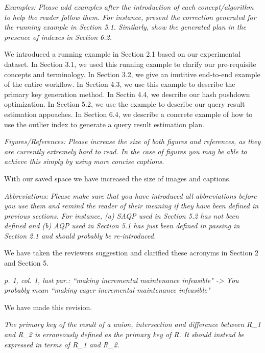 \vspace{1em}
\emph{Examples: Please add examples after the introduction of each concept/algorithm to help the reader follow them. For instance, present the correction generated for the running example in Section 5.1. Similarly, show the generated plan in the presence of indexes in Section 6.2.}

We introduced a running example in Section 2.1 based on our experimental dataset. In Section 3.1, we used this running example to clarify our pre-requisite concepts and terminology. In Section 3.2, we give an inutitive end-to-end example of the entire workflow. In Section 4.3, we use this example to describe the primary key generation method. In Sectin 4.4, we describe our hash pushdown optimization. In Section 5.2, we use the example to describe our query result estimation appoaches.  In Section 6.4, we describe a concrete example of how to use the outlier index to generate a query result estimation plan.

\vspace{1em}
\emph{Figures/References: Please increase the size of both figures and references, as they are currently extremely hard to read. In the case of figures you may be able to achieve this simply by using more concise captions.}

With our saved space we have increased the size of images and captions.

\vspace{1em}
\emph{Abbreviations: Please make sure that you have introduced all abbreviations before you use them and remind the reader of their meaning if they have been defined in previous sections. For instance, (a) SAQP used in Section 5.2 has not been defined and (b) AQP used in Section 5.1 has just been defined in passing in Section 2.1 and should probably be re-introduced.}

We have taken the reviewers suggestion and clarified these acronyms in Section 2 and Section 5.

\vspace{1em}
\emph{p. 1, col. 1, last par.: ``making incremental maintenance infeasible" -> You probably mean ``making eager incremental maintenance infeasible"}

We have made this revision.

\vspace{1em}
\emph{The primary key of the result of a union, intersection and difference between R\_1 and R\_2 is erroneously defined as the primary key of R. It should instead be expressed in terms of R\_1 and R\_2.}

